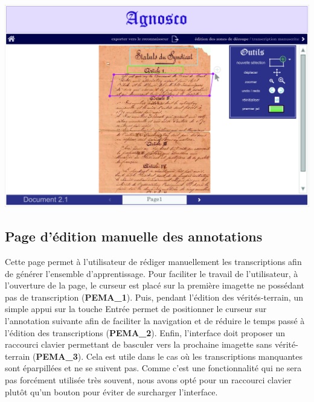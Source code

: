 \begin{mdframed}[frametitle={Figure 7 : Édition des zones de découpe}, innerbottommargin=10]
\begin{center}
\includegraphics[scale=0.05]{ihm2.jpg}
\end{center}
\end{mdframed}

\subsection{Page d'édition manuelle des annotations}

Cette page permet à l’utilisateur de rédiger manuellement les transcriptions
afin de générer l’ensemble d’apprentissage. Pour faciliter le travail de
l’utilisateur, à l’ouverture de la page, le curseur est placé sur la première
imagette ne possédant pas de transcription (\textbf{PEMA\_1}). Puis, pendant
l’édition des vérités-terrain, un simple appui sur la touche Entrée permet de
positionner le curseur sur l’annotation suivante afin de faciliter la
navigation et de réduire le temps passé à l’édition des transcriptions
(\textbf{PEMA\_2}). Enfin, l’interface doit proposer un raccourci clavier
permettant de basculer vers la prochaine imagette sans vérité-terrain
(\textbf{PEMA\_3}). Cela est utile dans le cas où les transcriptions manquantes
sont éparpillées et ne se suivent pas. Comme c’est une fonctionnalité qui ne
sera pas forcément utilisée très souvent, nous avons opté pour un raccourci
clavier plutôt qu’un bouton pour éviter de surcharger l’interface.

